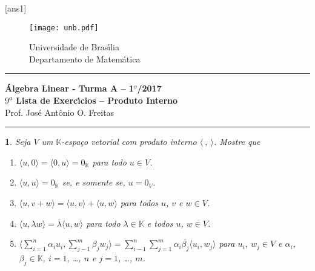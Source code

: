 \documentclass[12pt]{exam}
\newtheorem{exercicio}{}
\newcommand{\cp}[1]{\mathbb{#1}}
\newcommand{\vesp}[1]{\vspace{ #1  cm}}
\begin{document}
\pagestyle{empty}

[ans1]

\begin{figure}[h]
        \begin{minipage}[c]{1.7cm}
        \texttt{[image: unb.pdf]}
        \end{minipage}%
        \hspace{0pt}
        \begin{minipage}[c]{4in}
          {Universidade de Bras{\'\i}lia} \\
          {Departamento de Matem{\'a}tica}
\end{minipage}
\end{figure}

\vesp{-0.35} \hrule

\begin{center}
{\Large\bf \'Algebra Linear - Turma A -- 1$^{o}$/2017} \\ \vspace{9pt} {\large\bf
  $9^{\underline{a}}$ Lista de Exerc{\'\i}cios -- Produto Interno}\\ \vspace{9pt} Prof. Jos{\'e} Ant{\^o}nio O. Freitas
\end{center}
\hrule

\vesp{.6}

\begin{exercicio}
  Seja $V$ um $\cp{K}$-espa\c{c}o vetorial com produto interno $\langle\ ,\ \rangle$. Mostre que
  \begin{enumerate}[label=({\alph*})]
    \item $\langle u, 0\rangle = \langle 0, u\rangle = 0_\cp{K}$ para todo $u \in V$.
    \item $\langle u, u\rangle = 0_\cp{K}$ se, e somente se, $u = 0_V$.
    \item $\langle u, v + w\rangle = \langle u, v\rangle + \langle u, w\rangle$ para todos $u$, $v$ e $w \in V$.
    \item $\langle u, \lambda w\rangle = \overline{\lambda} \langle u, w\rangle$ para todo $\lambda \in \cp{K}$ e todos $u$, $w \in V$.
    \item $\displaystyle\langle \sum_{i = 1}^n\alpha_iu_i, \sum_{j - 1}^m\beta_jw_j\rangle = \sum_{i - 1}^n\sum_{j = 1}^m\alpha_i\overline{\beta_j}\langle u_i, w_j \rangle$ para $u_i$, $w_j \in V$ e $\alpha_i$, $\beta_j \in \cp{K}$, $i = 1$, \dots, $n$ e $j = 1$, \dots, $m$.
  \end{enumerate}
\end{exercicio}
\end{document}
